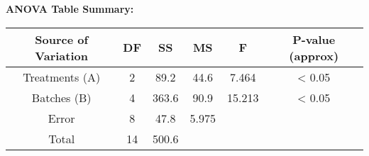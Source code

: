 \textbf{ANOVA Table Summary:}

\begin{table}[h]
	\centering
	\begin{tabular}{|c|c|c|c|c|c|}
		\hline
		Source of Variation & DF & SS & MS & F & P-value (approx) \\
		\hline
		Treatments (A) & 2 & 89.2 & 44.6 & 7.464 & < 0.05 \\
		\hline
		Batches (B) & 4 & 363.6 & 90.9 & 15.213 & < 0.05 \\
		\hline
		Error & 8 & 47.8 & 5.975 &  &  \\
		\hline
		Total & 14 & 500.6 &  &  &  \\
		\hline
	\end{tabular}
\end{table}